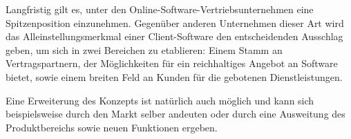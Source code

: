 Langfristig gilt es, unter den Online-Software-Vertriebsunternehmen eine Spitzenposition einzunehmen. Gegenüber anderen Unternehmen dieser Art wird das Alleinstellungsmerkmal einer Client-Software den entscheidenden Ausschlag geben, um sich in zwei Bereichen zu etablieren: Einem Stamm an Vertragspartnern, der Möglichkeiten für ein reichhaltiges Angebot an Software bietet, sowie einem breiten Feld an Kunden für die gebotenen Dienstleistungen.

Eine Erweiterung des Konzepts ist natürlich auch möglich und kann sich beispielsweise durch den Markt selber andeuten oder durch eine Ausweitung des Produktbereichs sowie neuen Funktionen ergeben.
